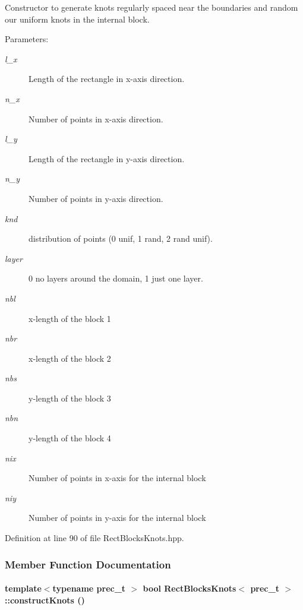 Constructor to generate knots regularly spaced near the boundaries and random our uniform knots in the internal block. 

\begin{Desc}
\item[Parameters:]
\begin{description}
\item[{\em l\_\-x}]Length of the rectangle in x-axis direction. \item[{\em n\_\-x}]Number of points in x-axis direction. \item[{\em l\_\-y}]Length of the rectangle in y-axis direction. \item[{\em n\_\-y}]Number of points in y-axis direction. \item[{\em knd}]distribution of points (0 unif, 1 rand, 2 rand unif). \item[{\em layer}]0 no layers around the domain, 1 just one layer. \item[{\em nbl}]x-length of the block 1 \item[{\em nbr}]x-length of the block 2 \item[{\em nbs}]y-length of the block 3 \item[{\em nbn}]y-length of the block 4 \item[{\em nix}]Number of points in x-axis for the internal block \item[{\em niy}]Number of points in y-axis for the internal block \end{description}
\end{Desc}


Definition at line 90 of file RectBlocksKnots.hpp.

\subsubsection{Member Function Documentation}
\hypertarget{classRectBlocksKnots_cd9a8af5b8a5a241d149ff0b1efb4318}{
\paragraph[{constructKnots}]{\setlength{\rightskip}{0pt plus 5cm}template$<$typename prec\_\-t $>$ bool {\bf RectBlocksKnots}$<$ prec\_\-t $>$::constructKnots ()}\hfill}
\label{classRectBlocksKnots_cd9a8af5b8a5a241d149ff0b1efb4318}


